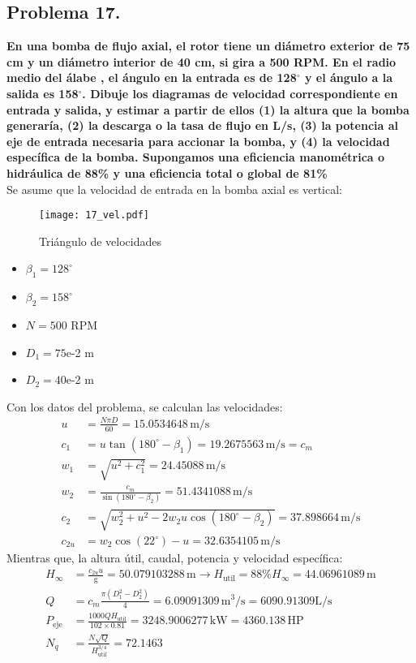 \documentclass[a4paper,12pt]{article}
\newcommand{\mrm}{\mathrm}
\begin{document}
\subsection*{Problema 17.}
\textbf{En una bomba de flujo axial, el rotor tiene un diámetro exterior de 75 cm y un diámetro interior de 40 cm, si gira a 500 RPM. En el radio medio del álabe , el ángulo en la entrada es de 128$^{\circ}$ y el ángulo a la salida es 158$^{\circ}$. Dibuje los diagramas de velocidad correspondiente en entrada y salida, y estimar a partir de ellos (1) la altura que la bomba generaría, (2) la descarga o la tasa de flujo en L/s, (3) la potencia al eje de entrada necesaria para accionar la bomba, y (4) la velocidad específica de la bomba. Supongamos una eficiencia manométrica o hidráulica de 88\% y una eficiencia total o global de 81\%}\\[4pt]
Se asume que la velocidad de entrada en la bomba axial es vertical:
\begin{figure}[H]
    \centering
    \texttt{[image: 17\_vel.pdf]}
    \caption{Triángulo de velocidades}
\end{figure}
\begin{itemize}
    \item $\beta_{1} = 128^{\circ}$
    \item $\beta_{2} = 158^{\circ}$
    \item $N = 500$ RPM
    \item $D_{1} = 75$e-2 m
    \item $D_{2} = 40$e-2 m
\end{itemize}
Con los datos del problema, se calculan las velocidades:
\begin{align}
    u &= \frac{N\pi D}{60} = 15.0534648\,\mrm{m/s}\\[3pt]
    c_{1} &= u\tan(180^{\circ} -\beta_{1}) = 19.2675563\,\mrm{m/s} = c_{m}\\[3pt]
    w_{1} &= \sqrt{u^{2} + c_{1}^{2}} = 24.45088\,\mrm{m/s}\\[3pt]
    w_{2} &= \frac{c_{m}}{\sin (180^{\circ} - \beta_{2})} = 51.4341088\,\mrm{m/s}\\[4pt]
    c_{2} &= \sqrt{w_{2}^{2} + u^{2} - 2w_{2}u\cos(180^{\circ} - \beta_{2})} = 37.898664\,\mrm{m/s}\\[4pt]
    c_{2u} &= w_{2}\cos(22^{\circ}) - u = 32.6354105\,\mrm{m/s}
\end{align}
Mientras que, la altura útil, caudal, potencia y velocidad específica:
\begin{align}
    H_{\infty} &= \frac{c_{2u}u}{\mrm{g}} = 50.079103288\,\mrm{m} \longrightarrow H_{\mrm{util}} = 88\%H_{\infty} = 44.06961089\,\mrm{m}\\[4pt]
    Q &= c_{m}\frac{\pi (D_{1}^{2}-D_{2}^{2})}{4} = 6.09091309\,\mrm{m^{3}/s} = 6090.91309 \mrm{L/s}\\[4pt]
    P_{\mrm{eje}} &= \frac{1000 Q H_{\mrm{util}}}{102\times 0.81} = 3248.9006277 \,\mrm{kW} = 4360.138\,\mrm{HP}\\[4pt] 
    N_{q} &= \frac{N\sqrt{Q}}{H^{3/4}_{\mrm{util}}} = 72.1463
\end{align}
\end{document}
